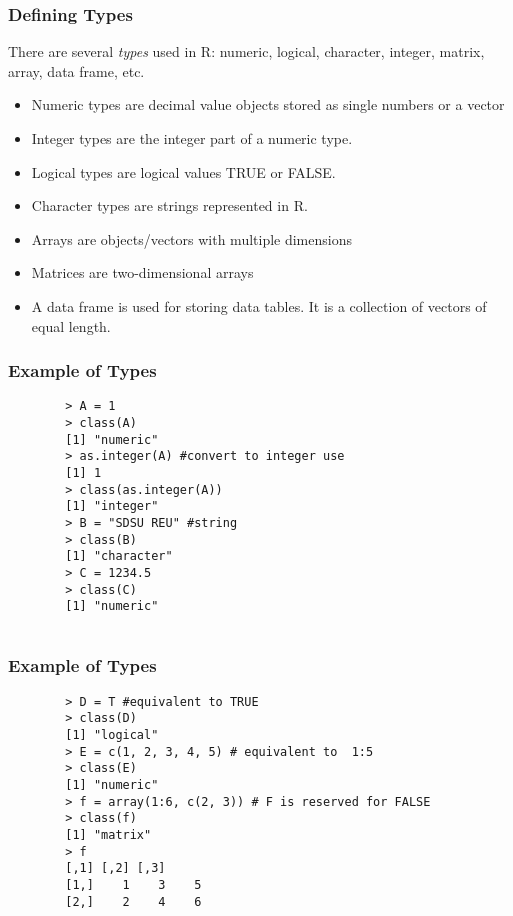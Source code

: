 \documentclass{beamer}
\begin{document}
	
\begin{frame}[fragile]\frametitle{Defining Types}
		There are several \textit{types} used in R: numeric, logical, character, integer, matrix, array, data frame, etc.
		\begin{itemize}
			\item Numeric types are decimal value objects stored as single numbers or a vector
			\item Integer types are the integer part of a numeric type.  
			\item Logical types are logical values TRUE or FALSE.
			\item Character types are strings represented in R.
			\item Arrays are objects/vectors with multiple dimensions
			\item Matrices are two-dimensional arrays
			\item A data frame is used for storing data tables. It is a collection of vectors of equal length.
		\end{itemize}
\end{frame}

\begin{frame}[fragile]\frametitle{Example of Types}
	\begin{framed}
				\vspace{-0.25cm}
		\begin{verbatim}
		> A = 1
		> class(A)
		[1] "numeric"
		> as.integer(A) #convert to integer use
		[1] 1
		> class(as.integer(A))
		[1] "integer"
		> B = "SDSU REU" #string
		> class(B) 
		[1] "character"
		> C = 1234.5 
		> class(C)
		[1] "numeric"
		
		\end{verbatim}
	\end{framed}
\end{frame}

\begin{frame}[fragile]\frametitle{Example of Types}
	\begin{framed}
		\vspace{-0.25cm}
		\begin{verbatim}
		> D = T #equivalent to TRUE
		> class(D)
		[1] "logical"
		> E = c(1, 2, 3, 4, 5) # equivalent to  1:5
		> class(E)
		[1] "numeric"
		> f = array(1:6, c(2, 3)) # F is reserved for FALSE
		> class(f)
		[1] "matrix"
		> f
		[,1] [,2] [,3]
		[1,]    1    3    5
		[2,]    2    4    6
		\end{verbatim}
	\end{framed}
\end{frame}
\end{document}
